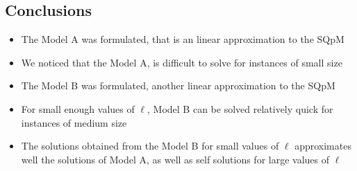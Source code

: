
\subsection{Conclusions}
\begin{frame}
  
  \begin{itemize}
  \item The Model A was formulated, that is an linear approximation to the SQpM
  \item We noticed that the Model A, is difficult to solve for instances of small size
  \item The Model B was formulated, another linear approximation to the SQpM
  \item For small enough values of $\ell$, Model B can be solved relatively quick
    for instances of medium size
  \item The solutions obtained from the Model B for small values of $\ell$
    approximates well the solutions of Model A,
    as well as self solutions for large values of $\ell$
  \end{itemize}

\end{frame}
